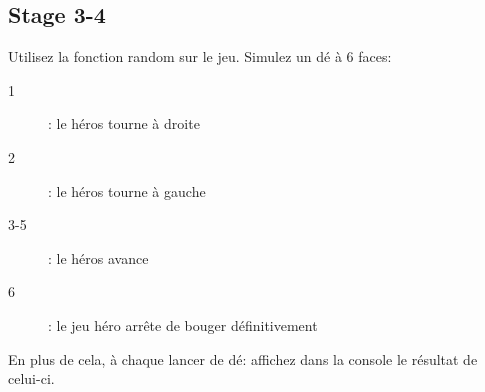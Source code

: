 \subsection{Stage 3-4}

Utilisez la fonction random sur le jeu.
Simulez un dé à 6 faces:
\begin{description}
	\item[1]: le héros tourne à droite
	\item[2]: le héros tourne à gauche
	\item[3-5]: le héros avance
	\item[6]: le jeu héro arrête de bouger définitivement
\end{description}

En plus de cela, à chaque lancer de dé: affichez dans la console le résultat de celui-ci.


